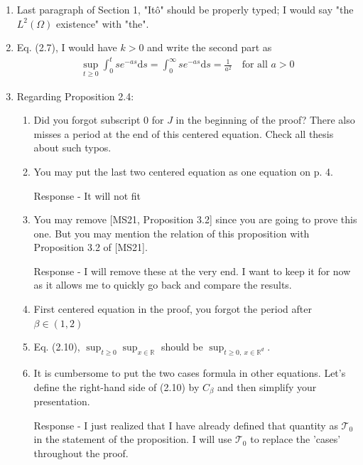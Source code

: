 \documentclass[a4paper,10pt]{article}
\def\R{\mathbb{R}}
\def\ud{\text{d}}
\begin{document}
\begin{enumerate}
  \item Last paragraph of Section 1, "It\^o" should be properly typed; I would say "the $L^2(\Omega)$ existence" with
    "the".
  \item Eq. (2.7), I would have $k>0$ and write the second part as
    \begin{align*}
      \sup_{t\ge 0} \int_0^t se^{-a s} \ud s = \int_0^\infty se^{-a s} \ud s = \frac{1}{a^2} \quad \text{for all $a>0$}
    \end{align*}
  \item Regarding Proposition 2.4:
     \begin{enumerate}
       \item Did you forgot subscript $0$ for $J$ in the beginning of the proof? There also misses a period at the end
         of this centered equation. Check all thesis about such typos.
       \item You may put the last two centered equation as one equation on p. 4.

       Response - It will not fit
       \item You may remove [MS21, Proposition 3.2] since you are going to prove this one. But you may mention the
         relation of this proposition with Proposition 3.2 of [MS21].

         Response - I will remove these at the very end. I want to keep it for now as it allows me to quickly go back
         and compare the results.

       \item First centered equation in the proof, you forgot the period after $\beta\in(1,2)$
       \item Eq. (2.10), $\sup_{t\ge 0}\sup_{x\in\R}$ should be $\displaystyle\sup_{t\ge 0,\:x\in\R^d}$.
       \item It is cumbersome to put the two cases formula in other equations. Let's define the right-hand side of
         (2.10) by $C_\beta$ and then simplify your presentation.

         Response - I just realized that I have already defined that quantity as $\mathcal{T}_0$ in the statement of the
         proposition. I will use $\mathcal{T}_0$ to replace the 'cases' throughout the proof.


\end{enumerate}
\end{enumerate}
\end{document}

